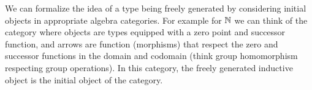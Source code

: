 \documentclass[11pt]{article}
\begin{document}
\begin{remark}
  We can formalize the idea of a type being freely generated by considering initial objects in appropriate algebra categories.
  For example for $\mathbb{N}$ we can think of the category where objects are types equipped with a zero point and successor function, and arrows are function (morphisms) that respect the zero and successor functions in the domain and codomain (think group homomorphism respecting group operations).
  In this category, the freely generated inductive object is the initial object of the category.
\end{remark}
\end{document}
